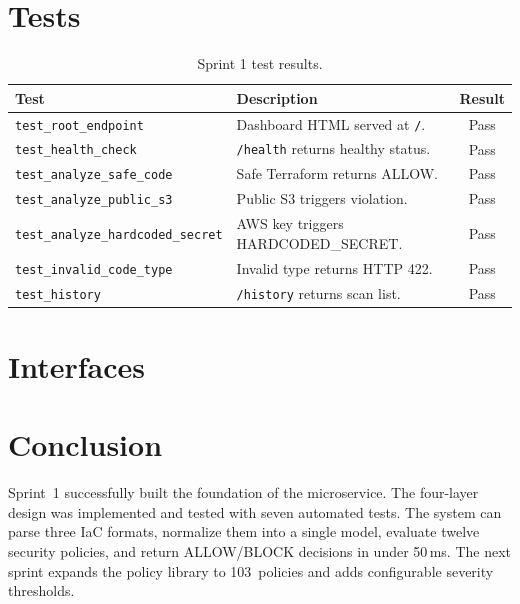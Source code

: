 \section{Tests}

\begin{table}[H]
\centering
\begin{tabularx}{\textwidth}{|l|X|c|}
\hline
\textbf{Test} & \textbf{Description} & \textbf{Result} \\
\hline
\texttt{test\_root\_endpoint}           & Dashboard HTML served at \texttt{/}. & Pass \\
\hline
\texttt{test\_health\_check}            & \texttt{/health} returns healthy status. & Pass \\
\hline
\texttt{test\_analyze\_safe\_code}      & Safe Terraform returns ALLOW. & Pass \\
\hline
\texttt{test\_analyze\_public\_s3}      & Public S3 triggers violation. & Pass \\
\hline
\texttt{test\_analyze\_hardcoded\_secret} & AWS key triggers HARDCODED\_SECRET. & Pass \\
\hline
\texttt{test\_invalid\_code\_type}      & Invalid type returns HTTP 422. & Pass \\
\hline
\texttt{test\_history}                  & \texttt{/history} returns scan list. & Pass \\
\hline
\end{tabularx}
\caption{Sprint 1 test results.}
\label{tab:s1-tests}
\end{table}


\section{Interfaces}



\section{Conclusion}

Sprint~1 successfully built the foundation of the microservice. The four-layer design was implemented and tested with seven automated tests. The system can parse three IaC formats, normalize them into a single model, evaluate twelve security policies, and return ALLOW/BLOCK decisions in under 50\,ms. The next sprint expands the policy library to 103~policies and adds configurable severity thresholds.
